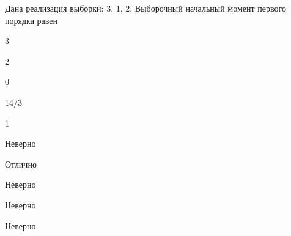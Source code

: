 
\begin{question}
Дана реализация выборки: 3, 1, 2. Выборочный начальный момент первого
порядка равен
\begin{answerlist}
  \item 3
  \item 2
  \item 0
  \item 14/3
  \item 1
\end{answerlist}
\end{question}

\begin{solution}
\begin{answerlist}
  \item Неверно
  \item Отлично
  \item Неверно
  \item Неверно
  \item Неверно
\end{answerlist}
\end{solution}

